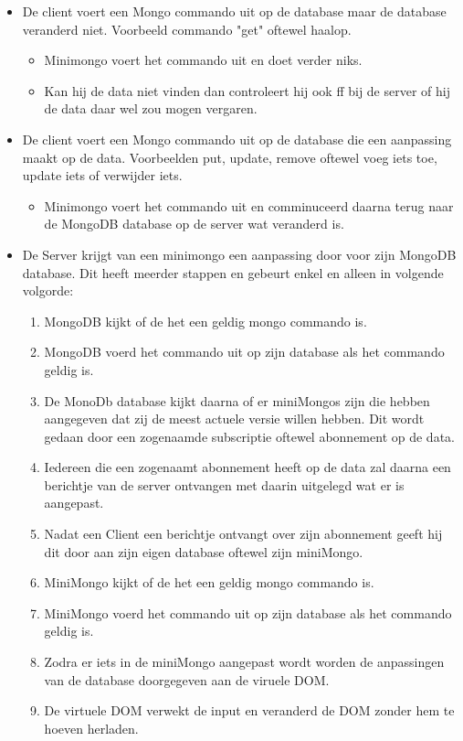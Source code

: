 \documentclass[]{report}
\begin{document}
\begin{itemize}
	\item De client voert een Mongo commando uit op de database maar de database veranderd niet. Voorbeeld commando "get" oftewel haalop.
	\begin{itemize}
		\item Minimongo voert het commando uit en doet verder niks.
		\item Kan hij de data niet vinden dan controleert hij ook ff bij de server of hij de data daar wel zou mogen vergaren.
		\newline
	\end{itemize}

	\item De client voert een Mongo commando uit op de database die een aanpassing maakt op de data. Voorbeelden put, update, remove oftewel voeg iets toe, update iets of verwijder iets.
	\begin{itemize}
		\item Minimongo voert het commando uit en comminuceerd daarna terug naar de MongoDB database op de server wat veranderd is.
		\newline
	\end{itemize}

	\item De Server krijgt van een minimongo een aanpassing door voor zijn MongoDB database. Dit heeft meerder stappen en gebeurt enkel en alleen in volgende volgorde:
	\begin{enumerate}
		\item MongoDB kijkt of de het een geldig mongo commando is.
		\item MongoDB voerd het commando uit op zijn database als het commando geldig is.
		\item De MonoDb database kijkt daarna of er miniMongos zijn die hebben aangegeven dat zij de meest actuele versie willen hebben. Dit wordt gedaan door een zogenaamde subscriptie oftewel abonnement op de data. 
		\item Iedereen die een zogenaamt abonnement heeft op de data zal daarna een berichtje van de server ontvangen met daarin uitgelegd wat er is aangepast.
		\item Nadat een Client een berichtje ontvangt over zijn abonnement geeft hij dit door aan zijn eigen database oftewel zijn miniMongo.
		\item MiniMongo kijkt of de het een geldig mongo commando is.
		\item MiniMongo voerd het commando uit op zijn database als het commando geldig is.
		\item Zodra er iets in de miniMongo aangepast wordt worden de anpassingen van de database doorgegeven aan de viruele DOM.
		\item De virtuele DOM verwekt de input en veranderd de DOM zonder hem te hoeven herladen.
		\newline
	\end{enumerate}
\end{itemize}
\end{document}
